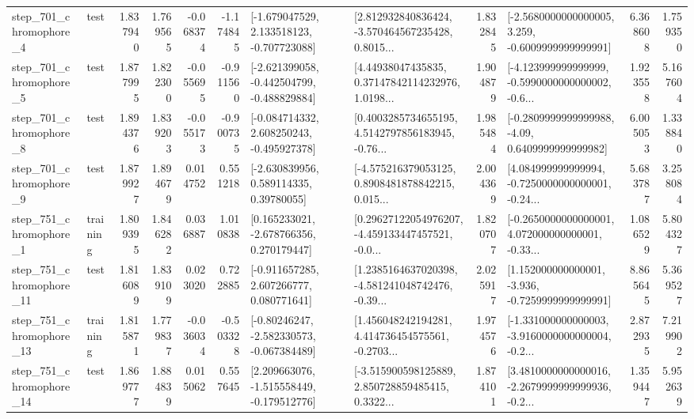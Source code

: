\begin{tabular}{llrrrrllrlrr}
   step\_701\_chromophore\_4 &      test &      1.837940 &    1.769565 &     -0.068374 & -1.174845 &   [-1.679047529, 2.133518123, -0.707723088] &  [2.812932840836424, -3.570464567235428, 0.8015... &       1.832845 &  [-2.5680000000000005, 3.259, -0.6009999999999991] &            6.368608 &          1.759350 \\
   step\_701\_chromophore\_5 &      test &      1.877995 &    1.822300 &     -0.055695 & -0.911560 &  [-2.621399058, -0.442504799, -0.488829884] &  [4.44938047435835, 0.37147842114232976, 1.0198... &       1.904879 &  [-4.123999999999999, -0.5990000000000002, -0.6... &            1.923558 &          5.167604 \\
   step\_701\_chromophore\_8 &      test &      1.894376 &    1.839203 &     -0.055173 & -0.900735 &   [-0.084714332, 2.608250243, -0.495927378] &  [0.4003285734655195, 4.5142797856183945, -0.76... &       1.985484 &   [-0.2809999999999988, -4.09, 0.6409999999999982] &            6.005053 &          1.338840 \\
   step\_701\_chromophore\_9 &      test &      1.879927 &    1.894679 &      0.014752 &  0.551218 &     [-2.630839956, 0.589114335, 0.39780055] &  [-4.575216379053125, 0.8908481878842215, 0.015... &       2.004369 &  [4.084999999999994, -0.7250000000000001, -0.24... &            5.683787 &          3.258084 \\
   step\_751\_chromophore\_1 &  training &      1.809395 &    1.846282 &      0.036887 &  1.010838 &    [0.165233021, -2.678766356, 0.270179447] &  [0.29627122054976207, -4.459133447457521, -0.0... &       1.820707 &  [-0.2650000000000001, 4.072000000000001, -0.33... &            1.086529 &          5.804327 \\
  step\_751\_chromophore\_11 &      test &      1.816089 &    1.839109 &      0.023020 &  0.722885 &    [-0.911657285, 2.607266777, 0.080771641] &  [1.2385164637020398, -4.581241048742476, -0.39... &       2.025917 &   [1.152000000000001, -3.936, -0.7259999999999991] &            8.865645 &          5.369527 \\
  step\_751\_chromophore\_13 &  training &      1.815871 &    1.779837 &     -0.036034 & -0.503328 &   [-0.80246247, -2.582330573, -0.067384489] &  [1.456048242194281, 4.414736454575561, -0.2703... &       1.974576 &  [-1.331000000000003, -3.9160000000000004, -0.2... &            2.872935 &          7.219902 \\
  step\_751\_chromophore\_14 &      test &      1.869777 &    1.884839 &      0.015062 &  0.557645 &   [2.209663076, -1.515558449, -0.179512776] &  [-3.515900598125889, 2.850728859485415, 0.3322... &       1.874101 &  [3.4810000000000016, -2.2679999999999936, -0.2... &            1.359447 &          5.952639 \\

\end{tabular}
